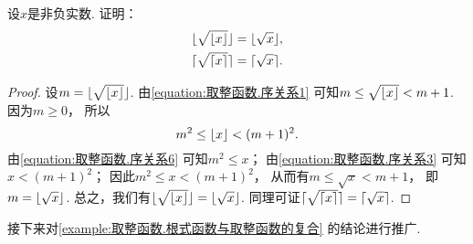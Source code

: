 \begin{example}\label{example:取整函数.根式函数与取整函数的复合}
设\(x\)是非负实数.
证明：\begin{gather}
	\lfloor\sqrt{\lfloor x\rfloor}\rfloor = \lfloor\sqrt{x}\rfloor, \\
	\lceil\sqrt{\lceil x\rceil}\rceil = \lceil\sqrt{x}\rceil.
\end{gather}
\begin{proof}
设\(m = \lfloor\sqrt{\lfloor x\rfloor}\rfloor\).
由\cref{equation:取整函数.序关系1}
可知\(m \leq \sqrt{\lfloor x\rfloor} < m+1\).
因为\(m \geq 0\)，
所以\begin{equation*}
	m^2 \leq \lfloor x\rfloor < (m+1)^2.
\end{equation*}
由\cref{equation:取整函数.序关系6}
可知\(m^2 \leq x\)；
由\cref{equation:取整函数.序关系3}
可知\(x < (m+1)^2\)；
因此\(m^2 \leq x < (m+1)^2\)，
从而有\(m \leq \sqrt{x} < m+1\)，
即\(m = \lfloor\sqrt{x}\rfloor\).
总之，我们有\(\lfloor\sqrt{\lfloor x\rfloor}\rfloor = \lfloor\sqrt{x}\rfloor\).
同理可证\(\lceil\sqrt{\lceil x\rceil}\rceil = \lceil\sqrt{x}\rceil\).
\end{proof}
\end{example}
接下来对\cref{example:取整函数.根式函数与取整函数的复合} 的结论进行推广.
